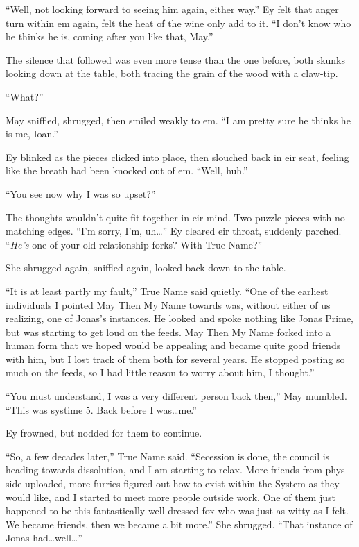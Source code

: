 ``Well, not looking forward to seeing him again, either way.'' Ey felt that anger turn within em again, felt the heat of the wine only add to it. ``I don't know who he thinks he is, coming after you like that, May.''

The silence that followed was even more tense than the one before, both skunks looking down at the table, both tracing the grain of the wood with a claw-tip.

``What?''

May sniffled, shrugged, then smiled weakly to em. ``I am pretty sure he thinks he is me, Ioan.''

Ey blinked as the pieces clicked into place, then slouched back in eir seat, feeling like the breath had been knocked out of em. ``Well, huh.''

``You see now why I was so upset?''

The thoughts wouldn't quite fit together in eir mind. Two puzzle pieces with no matching edges. ``I'm sorry, I'm, uh\ldots{}'' Ey cleared eir throat, suddenly parched. ``\emph{He's} one of your old relationship forks? With True Name?''

She shrugged again, sniffled again, looked back down to the table.

``It is at least partly my fault,'' True Name said quietly. ``One of the earliest individuals I pointed May Then My Name towards was, without either of us realizing, one of Jonas's instances. He looked and spoke nothing like Jonas Prime, but was starting to get loud on the feeds. May Then My Name forked into a human form that we hoped would be appealing and became quite good friends with him, but I lost track of them both for several years. He stopped posting so much on the feeds, so I had little reason to worry about him, I thought.''

``You must understand, I was a very different person back then,'' May mumbled. ``This was systime 5. Back before I was\ldots me.''

Ey frowned, but nodded for them to continue.

``So, a few decades later,'' True Name said. ``Secession is done, the council is heading towards dissolution, and I am starting to relax. More friends from phys-side uploaded, more furries figured out how to exist within the System as they would like, and I started to meet more people outside work. One of them just happened to be this fantastically well-dressed fox who was just as witty as I felt. We became friends, then we became a bit more.'' She shrugged. ``That instance of Jonas had\ldots well\ldots{}''


